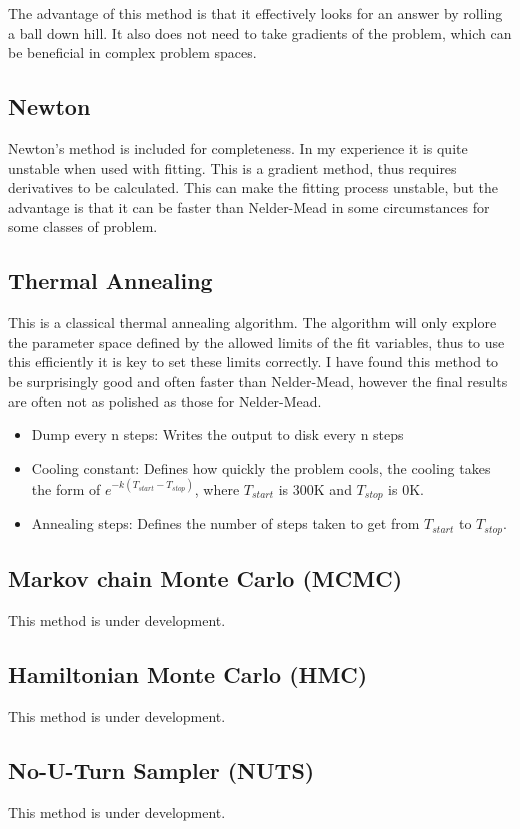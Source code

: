The advantage of this method is that it effectively looks for an answer by rolling a ball down hill. It also does not need to take gradients of the problem, which can be beneficial in complex problem spaces.

\subsection{Newton}
Newton's method is included for completeness. In my experience it is quite unstable when used with fitting. This is a gradient method, thus requires derivatives to be calculated. This can make the fitting process unstable, but the advantage is that it can be faster than Nelder-Mead in some circumstances for some classes of problem.

\subsection{Thermal Annealing}
This is a classical thermal annealing algorithm. The algorithm will only explore the parameter space defined by the allowed limits of the fit variables, thus to use this efficiently it is key to set these limits correctly. I have found this method to be surprisingly good and often faster than Nelder-Mead, however the final results are often not as polished as those for Nelder-Mead.

\begin{itemize}
  \item Dump every n steps: Writes the output to disk every n steps
  \item Cooling constant: Defines how quickly the problem cools, the cooling takes the form of $e^{-k(T_{start}-T_{stop})}$, where $T_{start}$ is 300K and $T_{stop}$ is 0K.
  \item Annealing steps: Defines the number of steps taken to get from $T_{start}$ to $T_{stop}$. 
\end{itemize}

\subsection{Markov chain Monte Carlo (MCMC)}
This method is under development.

\subsection{Hamiltonian Monte Carlo (HMC)}
This method is under development.

\subsection{No-U-Turn Sampler (NUTS)}
This method is under development.



